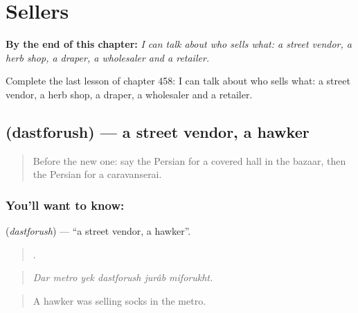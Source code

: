 
\chapter{Sellers}
\label{ch:fa-sellers}

\begin{chapteropening}
\textbf{By the end of this chapter:} \emph{I can talk about who sells what: a street vendor, a herb shop, a draper, a wholesaler and a retailer.}

Complete the last lesson of chapter 458: I can talk about who sells what: a street vendor, a herb shop, a draper, a wholesaler and a retailer.
\end{chapteropening}

\section[\texorpdfstring{\fa{دستفروش} (dastforush)}{دستفروش (dastforush)}]{ (dastforush) — a street vendor, a hawker}

\label{lesson:FA-C458-dastforush}



\begin{quote}
Before the new one: say the Persian for a covered hall in the bazaar, then the Persian for a caravanserai.
\end{quote}

\subsection*{You'll want to know: }
\textbf{} (\emph{dastforush}) — \textquotedblleft{}a street vendor, a hawker\textquotedblright{}.

\begin{quote}
     .
\end{quote}

\begin{quote}
\emph{Dar metro yek dastforush jurâb miforukht.}
\end{quote}

\begin{quote}
A hawker was selling socks in the metro.
\end{quote}

